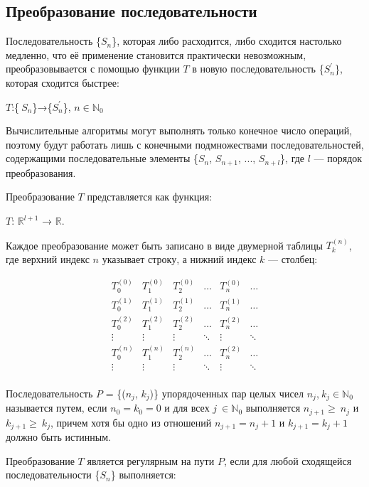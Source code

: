 \documentclass[14pt, a4paper]{extarticle}
\theoremstyle{definition}
\theoremstyle{remark}
\begin{document}
\subsection*{Преобразование последовательности}

Последовательность \{\(S_{n}\)\}, которая либо расходится, либо сходится
настолько медленно, что её применение становится практически
невозможным, преобразовывается с помощью функции \(T\) в новую
последовательность \{\(S_{n}^{'}\)\}, которая сходится быстрее:

\(T\):\{\(\ S_{n}\)\}→\{\(S_{n}^{'}\)\}, \(n \in \mathbb{N}_{0}\)

Вычислительные алгоритмы могут выполнять только конечное число операций,
поэтому будут работать лишь с конечными подмножествами
последовательностей, содержащими последовательные элементы \{\(S_{n}\),
\(S_{n + 1}\), ..., \(S_{n + l}\)\}, где \(l\) --- порядок
преобразования.

Преобразование \(T\) представляется как функция:

\(T\): \(\mathbb{R}^{l + 1}\) → \(\mathbb{R}\).

Каждое преобразование может быть записано в виде двумерной таблицы
\(T_{k}^{(n)}\), где верхний индекс \(n\) указывает строку, а нижний
индекс \(k\) --- столбец:

\[\begin{matrix}
T_{0}^{(0)} & T_{1}^{(0)} & T_{2}^{(0)} & \ldots & T_{n}^{(0)} & \ldots \\
T_{0}^{(1)} & T_{1}^{(1)} & T_{2}^{(1)} & \ldots & T_{n}^{(1)} & \ldots \\
T_{0}^{(2)} & T_{1}^{(2)} & T_{2}^{(2)} & \ldots & T_{n}^{(2)} & \ldots \\
 \vdots & \vdots & \vdots & \ddots & \vdots & \ddots \\
T_{0}^{(n)} & T_{1}^{(n)} & T_{2}^{(n)} & \ldots & T_{n}^{(2)} & \ldots \\
 \vdots & \vdots & \vdots & \ddots & \vdots & \ddots \\
\end{matrix}\]

Последовательность \(P\) = \{(\(n_{j}\), \(k_{j}\))\} упорядоченных пар
целых чисел \(n_{j}\),\(\ k_{j} \in \mathbb{N}_{0}\) называется путем, если \(n_{0} = k_{0} = 0\) и для всех
\(j\  \in \mathbb{N}_{0}\) выполняется \(n_{j + 1} \geq \ n_{j}\) и
\(k_{j + 1} \geq \ k_{j}\), причем хотя бы одно из отношений
\(n_{j + 1} = n_{j} + 1\) и \(k_{j + 1} = k_{j} + 1\) должно быть
истинным.

Преобразование \(T\) является регулярным на пути \(P\), если для любой
сходящейся последовательности \{\(S_{n}\)\} выполняется:
\end{document}
